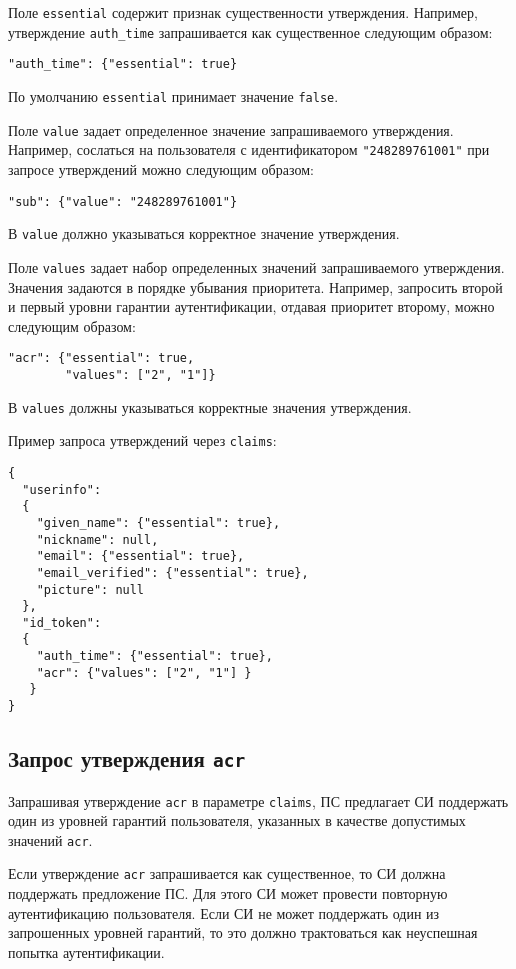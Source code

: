 Поле \lstinline{essential} содержит признак существенности утверждения. 
Например, утверждение \lstinline{auth_time} запрашивается как 
существенное следующим образом: 
\begin{lstlisting}
"auth_time": {"essential": true}
\end{lstlisting}

По умолчанию \lstinline{essential} принимает значение \lstinline{false}.

Поле \lstinline{value} задает определенное значение запрашиваемого 
утверждения. Например, сослаться на пользователя с идентификатором 
\lstinline{"248289761001"} при запросе утверждений можно следующим образом:
\begin{lstlisting}
"sub": {"value": "248289761001"}
\end{lstlisting}

В \lstinline{value} должно указываться корректное значение утверждения. 

Поле \lstinline{values} задает набор определенных значений запрашиваемого 
утверждения. Значения задаются в порядке убывания приоритета.
%
Например, запросить второй и первый уровни гарантии аутентификации,
отдавая приоритет второму, можно следующим образом:
\begin{lstlisting}
"acr": {"essential": true,
        "values": ["2", "1"]}
\end{lstlisting}

В \lstinline{values} должны указываться корректные значения утверждения.

Пример запроса утверждений через \lstinline{claims}:
\begin{lstlisting}
{
  "userinfo":
  {
    "given_name": {"essential": true},
    "nickname": null,
    "email": {"essential": true},
    "email_verified": {"essential": true},
    "picture": null
  },
  "id_token":
  {
    "auth_time": {"essential": true},
    "acr": {"values": ["2", "1"] }
   }
}
\end{lstlisting}

\subsection{Запрос утверждения \lstinline{acr}}\label{CLAIMS.ReqAcr}

Запрашивая утверждение \lstinline{acr} в параметре \lstinline{claims}, ПС 
предлагает СИ поддержать один из уровней гарантий пользователя, указанных в 
качестве допустимых значений \lstinline{acr}. 

Если утверждение \lstinline{acr} запрашивается как существенное,
то СИ должна поддержать предложение ПС. 
%
Для этого СИ может провести повторную аутентификацию пользователя. 
%
Если СИ не может поддержать один из запрошенных уровней гарантий, 
то это должно трактоваться как неуспешная попытка аутентификации.


